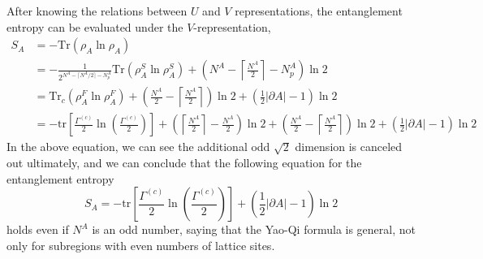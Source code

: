 \documentclass[12font]{article}
\theoremstyle{definition}
\numberwithin{equation}{section}
\newcommand{\lr}[1]{\left(  #1  \right)}
\newcommand{\lrm}[1]{\left[  #1  \right]}
\newcommand{\abs}[1]{\left|  #1  \right|}
\newcommand{\de}{\partial}
\newcommand{\mrm}[1]{\mathrm{#1}}
\newcommand{\Tr}{\mrm{Tr}}
\newcommand{\tr}{\mrm{tr}}
\begin{document}
After knowing the relations between $U$ and $V$ representations, the entanglement entropy can be evaluated under the $V$-representation,
\begin{align*}
  S_A 
  &= -\Tr\lr{\rho_A\ln\rho_A}\\
  &= -\frac{1}{2^{N^A-\lceil N^A/2\rceil -N_p^A}}\Tr\lr{\rho^S_A\ln\rho^S_A} + \lr{N^A-\left\lceil \frac{N^A}{2} \right\rceil - N^A_p}\ln 2 \\
  &= \Tr_c\lr{\rho^F_A\ln\rho^F_A} + \lr{\frac{N^A}{2}-\left\lceil \frac{N^A}{2} \right\rceil}\ln 2 + \lr{\frac{1}{2}\abs{\de A}-1}\ln 2 \\
  &= -\tr\lrm{\frac{\Gamma^{(c)}}{2}\ln\lr{\frac{\Gamma^{(c)}}{2}}} + \lr{\left\lceil\frac{N^A}{2}\right\rceil - \frac{N^A}{2}}\ln 2 + \lr{\frac{N^A}{2}-\left\lceil \frac{N^A}{2} \right\rceil}\ln 2 + \lr{\frac{1}{2}\abs{\de A}-1}\ln 2 
\end{align*}
In the above equation, we can see the additional odd $\sqrt{2}$ dimension is canceled out ultimately, and we can conclude that the following equation for the entanglement entropy
\begin{equation}\label{e.finally}
  S_A = -\tr\lrm{\frac{\Gamma^{(c)}}{2}\ln\lr{\frac{\Gamma^{(c)}}{2}}} + \lr{\frac{1}{2}\abs{\de A}-1}\ln 2
\end{equation}
holds even if $N^A$ is an odd number, saying that the Yao-Qi formula is general, not only for subregions with even numbers of lattice sites.
\end{document}
